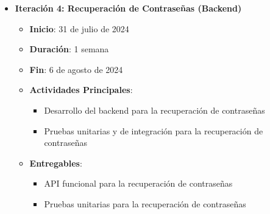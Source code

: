 \begin{itemize}
\begin{itemize}
              \item \textbf{Iteración 4: Recuperación de Contraseñas (Backend)}
                    \begin{itemize}
                        \item \textbf{Inicio}: 31 de julio de 2024
                        \item \textbf{Duración}: 1 semana
                        \item \textbf{Fin}: 6 de agosto de 2024
                        \item \textbf{Actividades Principales}:
                              \begin{itemize}
                                  \item Desarrollo del backend para la recuperación de contraseñas
                                  \item Pruebas unitarias y de integración para la recuperación de contraseñas
                              \end{itemize}
                        \item \textbf{Entregables}:
                              \begin{itemize}
                                  \item API funcional para la recuperación de contraseñas
                                  \item Pruebas unitarias para la recuperación de contraseñas
                              \end{itemize}
                    \end{itemize}


\end{itemize}
\end{itemize}
